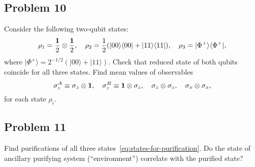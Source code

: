 \documentclass[a4paper,10pt]{article}
\newcommand{\ket}[1]{|#1\rangle}
\newcommand{\bra}[1]{\langle#1|}
\begin{document}
\subsection*{Problem 10}
Consider the following two-qubit states:
\begin{equation} \label{eq:states-for-purification}
	\rho_1= \frac{{\bf 1}}{2}\otimes \frac{{\bf 1}}{2}, \quad \rho_{2}=\frac{1}{2}(\ket{00}\bra{00}+\ket{11}\bra{11}), \quad \rho_{3}=\ket{\Phi^{+}}\bra{\Phi^{+}},
\end{equation}
where $\ket{\Phi^{+}}=2^{-1/2}(\ket{00}+\ket{11})$.
Check that reduced state of both qubits coincide for all three states.
Find mean values of observables
\begin{equation}
	\sigma_{z}^{A}\equiv \sigma_{z}\otimes {\bf 1}, \quad \sigma_{z}^{B}\equiv {\bf 1}\otimes  \sigma_{z}, \quad \sigma_{z}\otimes\sigma_{z}, \quad \sigma_{x}\otimes\sigma_{x},
\end{equation}
for each state $\rho_{i}$.


\subsection*{Problem 11}
Find purifications of all three states~\eqref{eq:states-for-purification}.
Do the state of ancillary purifying system (``environment'') correlate with the purified state?
\end{document}
